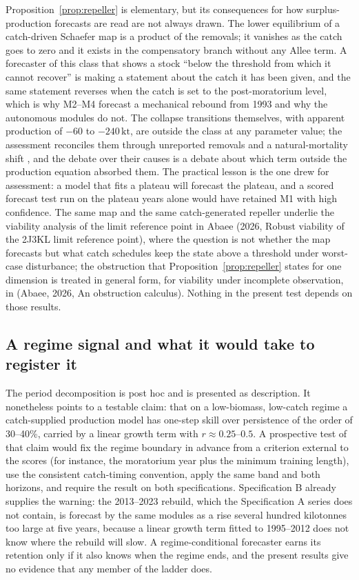\documentclass[preprint,11pt,authoryear]{elsarticle}
\theoremstyle{definition}
\theoremstyle{remark}
\newcommand{\kt}{\,\mathrm{kt}}
\begin{document}
Proposition~\ref{prop:repeller} is elementary, but its consequences for how surplus-production forecasts are read are not always drawn. The lower equilibrium of a catch-driven Schaefer map is a product of the removals; it vanishes as the catch goes to zero and it exists in the compensatory branch without any Allee term. A forecaster of this class that shows a stock ``below the threshold from which it cannot recover'' is making a statement about the catch it has been given, and the same statement reverses when the catch is set to the post-moratorium level, which is why M2--M4 forecast a mechanical rebound from 1993 and why the autonomous modules do not. The collapse transitions themselves, with apparent production of $-60$ to $-240\kt$, are outside the class at any parameter value; the assessment reconciles them through unreported removals and a natural-mortality shift \citep{Cadigan2016}, and the debate over their causes \citep{Hutchings1994,Walters1996,Myers1997,Shelton1999} is a debate about which term outside the production equation absorbed them. The practical lesson is the one \citet{Walters1996} drew for assessment: a model that fits a plateau will forecast the plateau, and a scored forecast test run on the plateau years alone would have retained M1 with high confidence. The same map and the same catch-generated repeller underlie the viability analysis of the limit reference point in Abaee (2026, Robust viability of the 2J3KL limit reference point), where the question is not whether the map forecasts but what catch schedules keep the state above a threshold under worst-case disturbance; the obstruction that Proposition~\ref{prop:repeller} states for one dimension is treated in general form, for viability under incomplete observation, in (Abaee, 2026, An obstruction calculus). Nothing in the present test depends on those results.

\subsection{A regime signal and what it would take to register it}\label{sec:regimesignal}

The period decomposition is post hoc and is presented as description. It nonetheless points to a testable claim: that on a low-biomass, low-catch regime a catch-supplied production model has one-step skill over persistence of the order of 30--40\%, carried by a linear growth term with $r\approx 0.25$--$0.5$. A prospective test of that claim would fix the regime boundary in advance from a criterion external to the scores (for instance, the moratorium year plus the minimum training length), use the consistent catch-timing convention, apply the same band and both horizons, and require the result on both specifications. Specification B already supplies the warning: the 2013--2023 rebuild, which the Specification A series does not contain, is forecast by the same modules as a rise several hundred kilotonnes too large at five years, because a linear growth term fitted to 1995--2012 does not know where the rebuild will slow. A regime-conditional forecaster earns its retention only if it also knows when the regime ends, and the present results give no evidence that any member of the ladder does.
\end{document}
